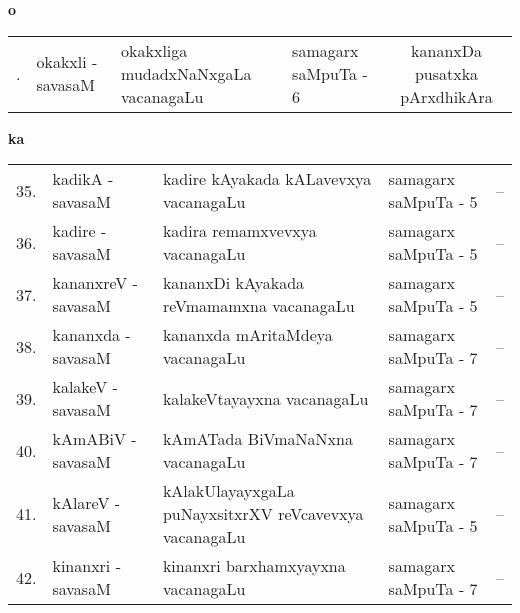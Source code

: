 \centerline{\bf o}

\medskip

{\renewcommand{\arraystretch}{1.35}
\begin{longtable}{rl>{\raggedright}p{5.5cm}lc}
\endfirsthead
\endhead
\endfoot
\endlastfoot
34. &  okakxli - savasaM &  okakxliga mudadxNaNxgaLa vacanagaLu & samagarx saMpuTa - 6  & kananxDa pusatxka pArxdhikAra\\
\end{longtable}}

\centerline{\bf ka}
\smallskip

{\renewcommand{\arraystretch}{1.35}
\begin{longtable}[l]{@{\qquad~}rl>{\raggedright}p{5.5cm}lc}
\endfirsthead
\endhead
\endfoot
\endlastfoot
35. &  kadikA - savasaM &  kadire kAyakada kALavevxya vacanagaLu & samagarx saMpuTa - 5 & --\\
36. &  kadire - savasaM &  kadira remamxvevxya vacanagaLu & samagarx saMpuTa - 5 & --\\
37. &  kananxreV - savasaM & kananxDi kAyakada reVmamamxna vacanagaLu & samagarx saMpuTa - 5 & --\\
38. &  kananxda - savasaM & kananxda mAritaMdeya vacanagaLu & samagarx saMpuTa - 7 & --\\
39. &  kalakeV - savasaM & kalakeVtayayxna vacanagaLu & samagarx saMpuTa - 7 & --\\
40. &  kAmABiV - savasaM & kAmATada BiVmaNaNxna vacanagaLu & samagarx saMpuTa - 7 & --\\
41. &  kAlareV - savasaM & kAlakUlayayxgaLa puNayxsitxrXV reVcavevxya\newline \phantom{AA} vacanagaLu & samagarx saMpuTa - 5 & --\\
42. &  kinanxri - savasaM & kinanxri barxhamxyayxna vacanagaLu & samagarx saMpuTa - 7 & --\\

\end{longtable}}
